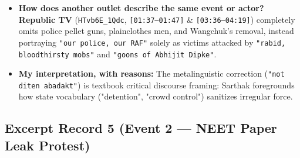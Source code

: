 \documentclass[10pt,a4paper]{article}
\begin{document}
\begin{itemize}[leftmargin=1.5em, itemsep=3pt, topsep=4pt]
  \item \textbf{How does another outlet describe the same event or actor?} \textbf{Republic TV} (\texttt{HTvb6E\_1Qdc}, \texttt{[01:37--01:47]} \& \texttt{[03:36--04:19]}) completely omits police pellet guns, plainclothes men, and Wangchuk's removal, instead portraying \texttt{"our police, our RAF"} solely as victims attacked by \texttt{"rabid, bloodthirsty mobs"} and \texttt{"goons of Abhijit Dipke"}.
  \item \textbf{My interpretation, with reasons:} The metalinguistic correction (\texttt{"not diten abadakt"}) is textbook critical discourse framing: Sarthak foregrounds how state vocabulary ("detention", "crowd control") sanitizes irregular force.
\end{itemize}

\subsection*{Excerpt Record 5 (Event 2 --- NEET Paper Leak Protest)}
\end{document}
